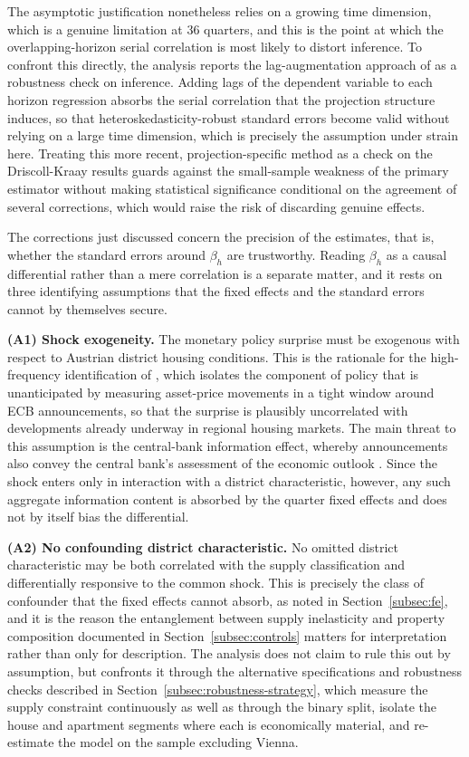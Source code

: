 \documentclass[a4paper,12pt, headsepline]{scrartcl}
\numberwithin{equation}{section}
\begin{document}
The \citet{driscoll1998} asymptotic justification nonetheless relies on a growing time dimension, which is a genuine limitation at 36 quarters, and this is the point at which the overlapping-horizon serial correlation is most likely to distort inference. To confront this directly, the analysis reports the lag-augmentation approach of \citet{montielolea2021} as a robustness check on inference. Adding lags of the dependent variable to each horizon regression absorbs the serial correlation that the projection structure induces, so that heteroskedasticity-robust standard errors become valid without relying on a large time dimension, which is precisely the assumption under strain here. Treating this more recent, projection-specific method as a check on the Driscoll-Kraay results guards against the small-sample weakness of the primary estimator without making statistical significance conditional on the agreement of several corrections, which would raise the risk of discarding genuine effects.

The corrections just discussed concern the precision of the estimates, that is, whether the standard errors around $\beta_h$ are trustworthy. Reading $\beta_h$ as a causal differential rather than a mere correlation is a separate matter, and it rests on three identifying assumptions that the fixed effects and the standard errors cannot by themselves secure.

\textbf{(A1) Shock exogeneity.} The monetary policy surprise must be exogenous with respect to Austrian district housing conditions. This is the rationale for the high-frequency identification of \citet{altavilla2019}, which isolates the component of policy that is unanticipated by measuring asset-price movements in a tight window around ECB announcements, so that the surprise is plausibly uncorrelated with developments already underway in regional housing markets. The main threat to this assumption is the central-bank information effect, whereby announcements also convey the central bank's assessment of the economic outlook \citep{jarocinski2020}. Since the shock enters only in interaction with a district characteristic, however, any such aggregate information content is absorbed by the quarter fixed effects and does not by itself bias the differential.

\textbf{(A2) No confounding district characteristic.} No omitted district characteristic may be both correlated with the supply classification and differentially responsive to the common shock. This is precisely the class of confounder that the fixed effects cannot absorb, as noted in Section~\ref{subsec:fe}, and it is the reason the entanglement between supply inelasticity and property composition documented in Section~\ref{subsec:controls} matters for interpretation rather than only for description. The analysis does not claim to rule this out by assumption, but confronts it through the alternative specifications and robustness checks described in Section~\ref{subsec:robustness-strategy}, which measure the supply constraint continuously as well as through the binary split, isolate the house and apartment segments where each is economically material, and re-estimate the model on the sample excluding Vienna.
\end{document}
